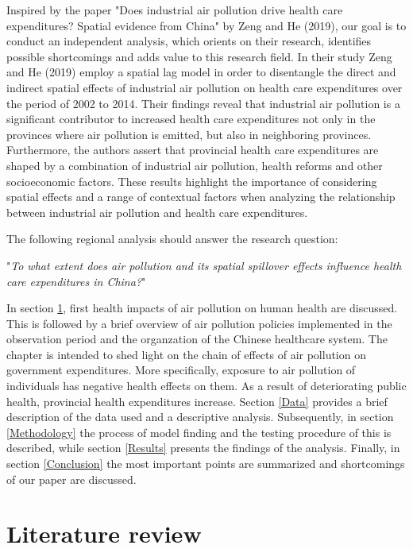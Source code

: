 \documentclass[]{article}
\begin{document}
Inspired by the paper "Does industrial air pollution drive health care expenditures? Spatial evidence from China" by Zeng and He (2019), our goal is to conduct an independent analysis, which orients on their research, identifies possible shortcomings and adds value to this research field. In their study Zeng and He (2019) employ a spatial lag model in order to disentangle the direct and indirect spatial effects of industrial air pollution on health care expenditures over the period of 2002 to 2014. Their findings reveal that industrial air pollution is a significant contributor to increased health care expenditures not only in the provinces where air pollution is emitted, but also in neighboring provinces. Furthermore, the authors assert that provincial health care expenditures are shaped by a combination of industrial air pollution, health reforms and other socioeconomic factors. These results highlight the importance of considering spatial effects and a range of contextual factors when analyzing the relationship between industrial air pollution and health care expenditures. %

The following regional analysis should answer the research question:

"\textit{To what extent does air pollution and its spatial spillover effects influence health care expenditures in China?}"

In section \ref{Literature review}, first health impacts of air pollution on human health are discussed. This is followed by a brief overview of air pollution policies implemented in the observation period and the organzation of the Chinese healthcare system. The chapter is intended to shed light on the chain of effects of air pollution on government expenditures. More specifically, exposure to air pollution of individuals has negative health effects on them. As a result of deteriorating public health, provincial health expenditures increase. 
Section \ref{Data} provides a brief description of the data used and a descriptive analysis. 
Subsequently, in section \ref{Methodology} the process of model finding and the testing procedure of this is described, while section \ref{Results} presents the findings of the analysis. 
Finally, in section \ref{Conclusion} the most important points are summarized and shortcomings of our paper are discussed. 

\hypertarget{literature review}{%
\section{Literature review}\label{Literature review}}
\end{document}

